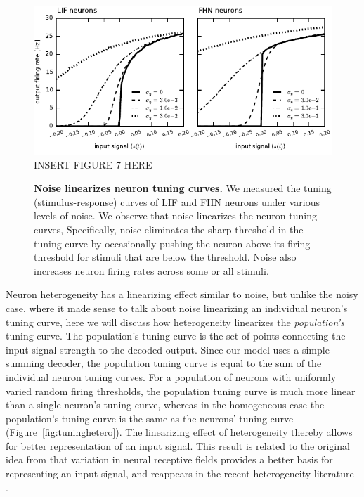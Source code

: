 \documentclass[12pt]{article}
\begin{document}
\begin{figure}
  \ifx\hidefigures\undefined
    \centering
    \includegraphics[width=\textwidth]{figure7_tuningnoisy.pdf}
  \else
    INSERT FIGURE 7 HERE
  \fi
  \caption{
    \textbf{Noise linearizes neuron tuning curves.}
    We measured the tuning (stimulus-response) curves of LIF and FHN neurons under various levels of noise.
    We observe that noise linearizes the neuron tuning curves,
    Specifically, noise eliminates the sharp threshold in the tuning curve by
    occasionally pushing the neuron above its firing threshold
    for stimuli that are below the threshold.
    Noise also increases neuron firing rates across some or all stimuli.
  }
  \label{fig:tuning}
\end{figure}

Neuron heterogeneity has a linearizing effect similar to noise,
but unlike the noisy case,
where it made sense to talk about noise
linearizing an individual neuron's tuning curve,
here we will discuss how heterogeneity
linearizes the \emph{population's} tuning curve.
The population's tuning curve is the set of points
connecting the input signal strength to the decoded output.
Since our model uses a simple summing decoder,
the population tuning curve is equal to
the sum of the individual neuron tuning curves.
For a population of neurons with uniformly varied random firing thresholds,
the population tuning curve is much more linear
than a single neuron's tuning curve,
whereas in the homogeneous case the population's tuning curve
is the same as the neurons' tuning curve (Figure~\ref{fig:tuninghetero}).
The linearizing effect of heterogeneity
thereby allows for better representation of an input signal.
This result is related to the original idea from \cite{Hubel1962}
that variation in neural receptive fields
provides a better basis for representing an input signal,
and reappears in the recent heterogeneity literature \citep{Angelo2012}.
\end{document}
